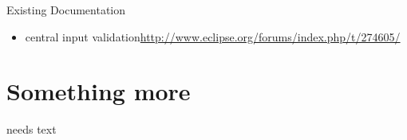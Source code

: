 \documentclass[a4paper,10pt,twoside]{book}
\begin{document}
\noindent Existing Documentation
\begin{itemize}
  \item central input validation\url{http://www.eclipse.org/forums/index.php/t/274605/}
\end{itemize}

\section{Something more}
needs text


\ifx\wholebook\relax\else
   
   
\end{document}
